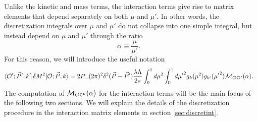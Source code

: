 \begin{subappendices}
Unlike the kinetic and mass terms, the interaction terms give rise to matrix elements that depend separately on both $\mu$ and $\mu'$. In other words, the discretization integrals over $\mu$ and $\mu'$ do not collapse into one simple integral, but instead depend on $\mu$ and $\mu'$ through the ratio \begin{equation}
	\boxed{\alpha \equiv \frac{\mu}{\mu'} .}
\end{equation} For this reason, we will introduce the useful notation \begin{equation}
	\begin{aligned}
		\langle {\cal O}'; \vec{P}', k'| \delta M^2 |{\cal O}; \vec{P}, k\rangle = 2P_- (2\pi)^2 \delta^2(\vec{P}- \vec{P}') \frac{\lambda \Lambda}{2\pi} \int_0^1 d\mu^2  \int_0^1d{\mu'}^2  g_k(\mu^2) g_{k'}({\mu'}^2) {\cal M}_{{\cal O} {\cal O}'}(\alpha).
	\end{aligned}
\end{equation} The computation of ${\cal M}_{{\cal O} {\cal O}'}(\alpha)$ for the interaction terms will be the main focus of the following two sections. We will explain the details of the discretization procedure in the interaction matrix elements in section \ref{sec:discretint}.


\end{subappendices}
